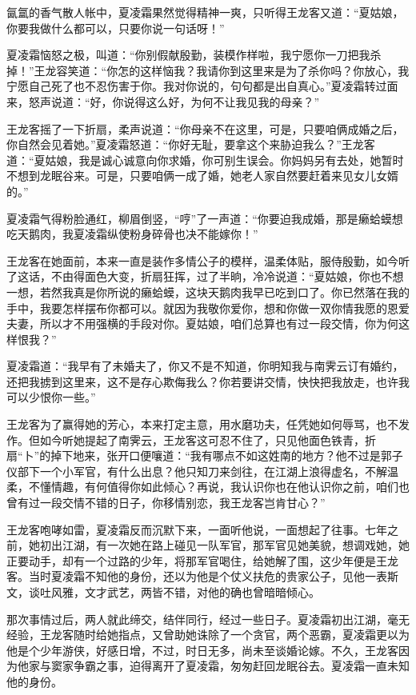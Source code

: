 \documentclass[12pt,oneside]{book}
\begin{document}
氤氲的香气散人帐中，夏凌霜果然觉得精神一爽，只听得王龙客又道：``夏姑娘，你要我做什么都可以，只要你说一句话呀！''

夏凌霜恼怒之极，叫道：``你别假献殷勤，装模作样啦，我宁愿你一刀把我杀掉！''王龙容笑道：``你怎的这样恼我？我请你到这里来是为了杀你吗？你放心，我宁愿自己死了也不忍伤害于你。我对你说的，句句都是出自真心。''夏凌霜转过面来，怒声说道：``好，你说得这么好，为何不让我见我的母亲？''

王龙客摇了一下折扇，柔声说道：``你母亲不在这里，可是，只要咱俩成婚之后，你自然会见着她。''夏凌霜怒道：``你好无耻，要拿这个来胁迫我么？''王龙客道：``夏姑娘，我是诚心诚意向你求婚，你可别生误会。你妈妈另有去处，她暂时不想到龙眠谷来。可是，只要咱俩一成了婚，她老人家自然要赶着来见女儿女婿的。''

夏凌霜气得粉脸通红，柳眉倒竖，``哼''了一声道：``你要迫我成婚，那是癞蛤蟆想吃天鹅肉，我夏凌霜纵使粉身碎骨也决不能嫁你！''

王龙客在她面前，本来一直是装作多情公子的模样，温柔体贴，服侍殷勤，如今听了这话，不由得面色大变，折扇狂挥，过了半晌，冷冷说道：``夏姑娘，你也不想一想，若然我真是你所说的癞蛤蟆，这块天鹅肉我早已吃到口了。你已然落在我的手中，我要怎样摆布你都可以。就因为我敬你爱你，想和你做一双你情我愿的恩爱夫妻，所以才不用强横的手段对你。夏姑娘，咱们总算也有过一段交情，你为何这样恨我？''

夏凌霜道：``我早有了未婚夫了，你又不是不知道，你明知我与南霁云订有婚约，还把我掳到这里来，这不是存心欺侮我么？你若要讲交情，快快把我放走，也许我可以少恨你一些。''

王龙客为了赢得她的芳心，本来打定主意，用水磨功夫，任凭她如何辱骂，也不发作。但如今听她提起了南霁云，王龙客这可忍不住了，只见他面色铁青，折扇``卜''的掉下地来，张开口便嚷道：``我有哪点不如这姓南的地方？他不过是郭子仪部下一个小军官，有什么出息？他只知刀来剑往，在江湖上浪得虚名，不解温柔，不懂情趣，有何值得你如此倾心？再说，我认识你也在他认识你之前，咱们也曾有过一段交情不错的日子，你移情别恋，我王龙客岂肯甘心？''

王龙客咆哮如雷，夏凌霜反而沉默下来，一面听他说，一面想起了往事。七年之前，她初出江湖，有一次她在路上碰见一队军官，那军官见她美貌，想调戏她，她正要动手，却有一个过路的少年，将那军官喝住，给她解了围，这少年便是王龙客。当时夏凌霜不知他的身份，还以为他是个仗义扶危的贵家公子，见他一表斯文，谈吐风雅，文才武艺，两皆不错，对他的确也曾暗暗倾心。

那次事情过后，两人就此缔交，结伴同行，经过一些日子。夏凌霜初出江湖，毫无经验，王龙客随时给她指点，又曾助她诛除了一个贪官，两个恶霸，夏凌霜更以为他是个少年游侠，好感日增，不过，时日无多，尚未至谈婚论嫁。不久，王龙客因为他家与窦家争霸之事，迫得离开了夏凌霜，匆匆赶回龙眠谷去。夏凌霜一直未知他的身份。
\end{document}
